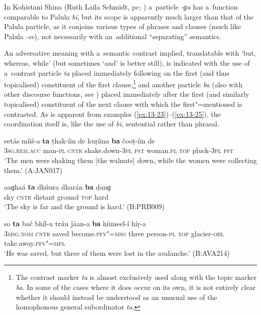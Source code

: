In Kohistani Shina (Ruth Laila Schmidt, pc; \citealt[252]{schmidtkohistani2008}) a~particle \textit{-ɡa} has a~function comparable to Palula \textit{bi}, but its scope is apparently much larger than that of the Palula particle, as it conjoins various types of phrases and clauses (much like Palula \textit{-ee}), not necessarily with an~additional ``separating'' semantics. 


 An adversative meaning with a~semantic contrast implied, translatable with `but, whereas, while' (but sometimes `and' is better still), is indicated with the use of a~contrast particle \textit{ta} placed immediately following on the first (and thus topicalised) constituent of the first clause,\footnote{The contrast marker \textit{ta} is almost exclusively used along with the topic marker \textit{ba}. In some of the cases where it does occur on its own, it is not entirely clear whether it should instead be understood as an unusual use of the homophonous general subordinator \textit{ta}.} and another particle \textit{ba} (also with other discourse functions, see ) placed immediately after the first (and similarly topicalised) constituent of the next clause with which the first"=mentioned is contrasted. As is apparent from examples (\ref{ex:13-23})--(\ref{ex:13-25}), the coordination itself is, like the use of \textit{bi}, sentential rather than phrasal.

\begin{exe}
\ex
\label{ex:13-23}
\gll eetás {\ob}míiš-a \textbf{ta} ṭhak-íin de kuṛíina \textbf{ba} čooṭ-íin de{\cb}\\
\textsc{3sg.rem.acc} man-\textsc{pl} \textsc{cntr} shake.down-\textsc{3pl} \textsc{pst} woman.\textsc{pl} \textsc{top} pluck-\textsc{3pl} \textsc{pst}\\
\glt `The men were shaking them [the walnuts] down, while the women were collecting them.' (A:JAN017)

\ex
\label{ex:13-24}
\gll aaɡhaá \textbf{ta} dhúura dharán \textbf{ba} ḍanɡ  \\
sky \textsc{cntr} distant ground \textsc{top} hard \\
\glt `The sky is far and the ground is hard.' (B:PRB009)

\ex
\label{ex:13-25}
\gll so \textbf{ta} bač bhíl-u trúu ǰáan-a \textbf{ba} hiimeel-í híṛ-a\\
\textsc{3msg.nom} \textsc{cntr} saved become.\textsc{pfv"=msg} three person-\textsc{pl} \textsc{top} glacier-\textsc{obl} take.away.\textsc{pfv"=mpl}  \\
\glt `He was saved, but three of them were lost in the avalanche.' (B:AVA214) 
\end{exe}

